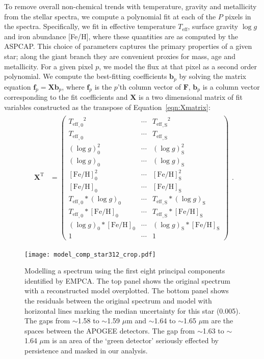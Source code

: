 \documentclass[a4paper,fleqn,usenatbib]{mnras}
\newcommand       \teff     {{T_{\mathrm{eff}}}}
\newcommand       \FeH		{{\mathrm{[Fe/H]}}}
\begin{document}
To remove overall non-chemical trends with temperature, gravity and metallicity from the stellar spectra, we compute a polynomial fit at each of the $P$ pixels in the spectra. Specifically, we fit in effective temperature $\teff$, surface gravity $\log g$ and iron abundance [Fe/H], where these quantities are as computed by the ASPCAP. This choice of parameters captures the primary properties of a given star; along the giant branch they are convenient proxies for mass, age and metallicity. For a given pixel $p$, we model the flux at that pixel as a second order polynomial. We compute the best-fitting coefficients $\mathbf{b}_p$ by solving the matrix equation $\mathbf{f}_{p} = \mathbf{X}\mathbf{b}_{p}$, where $\mathbf{f}_p$ is the $p$'th column vector of $\mathbf{F}$, $\mathbf{b}_{p}$ is a column vector corresponding to the fit coefficients and $\mathbf{X}$ is a two dimensional matrix of fit variables constructed as the transpose of Equation~\eqref{eqn:Xmatrix}:
\begin{equation}
\begin{aligned}
\begin{split}
\mathbf{X}^{\mathrm{T}} & =
\begin{pmatrix}
{\teff_{,0}}^2 & \cdots & {\teff_{,\mathrm{S}}}^2\\
\teff_{,0} & \cdots & \teff_{,\mathrm{S}}\\
(\log g)_0^2 & \cdots & (\log g)_{\mathrm{S}}^2\\
(\log g)_0 & \cdots & (\log g)_{\mathrm{S}}\\
\FeH_0^2 & \cdots & \FeH_{\mathrm{S}}^2\\
\FeH_0 & \cdots & \FeH_{\mathrm{S}}\\
\teff_{,0}*(\log g)_0 & \cdots & \teff_{,\mathrm{S}}*(\log g)_{\mathrm{S}}\\
\teff_{,0}*\FeH_0 & \cdots & \teff_{,\mathrm{S}}*\FeH_{\mathrm{S}}\\
(\log g)_0*\FeH_0 & \cdots & (\log g)_{\mathrm{S}}*\FeH_{\mathrm{S}}\\
1 & \cdots & 1
\end{pmatrix}
\end{split}.
\label{eqn:Xmatrix}
\end{aligned} 
\end{equation}

\begin{figure*}
\centering
\texttt{[image: model\_comp\_star312\_crop.pdf]}
\caption{Modelling a spectrum using the first eight principal components identified by EMPCA. The top panel shows the original spectrum with a reconstructed model overplotted. The bottom panel shows the residuals between the original spectrum and model with horizontal lines marking the median uncertainty for this star (0.005). The gaps from $\sim$1.58 to $\sim$1.59 $\mu$m and $\sim$1.64 to $\sim$1.65 $\mu$m are the spaces between the APOGEE detectors. The gap from $\sim$1.63 to $\sim$1.64 $\mu$m is an area of the `green detector' seriously effected by persistence and masked in our analysis.}
\label{fig:model}
\end{figure*}
\end{document}
